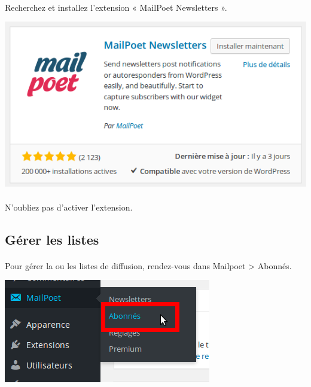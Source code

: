 \documentclass[10pt,a4paper]{article}
\begin{document}
\paragraph{}Recherchez et installez l'extension « MailPoet Newsletters ».
\begin{center}
\includegraphics[scale=0.3]{img/0205.png}
\end{center}
\paragraph{}N'oubliez pas d'activer l'extension.
\subsection{Gérer les listes}
\paragraph{}Pour gérer la ou les listes de diffusion, rendez-vous dans Mailpoet > Abonnés.
\begin{center}
\includegraphics[scale=0.3]{img/0206.png}
\end{center}
\end{document}
